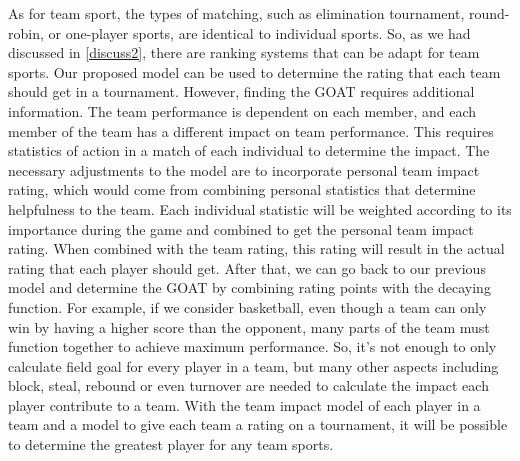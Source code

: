  As for team sport, the types of matching, such as elimination tournament,  round-robin, or one-player sports, are identical to individual sports. So, as we had discussed in \ref{discuss2}, there are ranking systems that can be adapt for team sports. Our proposed model can be used to determine the rating that each team should get in a tournament. However, finding the GOAT requires additional information. The team performance is dependent on each member, and each member of the team has a different impact on team performance. This requires statistics of action in a match of each individual to determine the impact. The necessary adjustments to the model are to incorporate personal team impact rating, which would come from combining personal statistics that determine helpfulness to the team. Each individual statistic will be weighted according to its importance during the game and combined to get the personal team impact rating. When combined with the team rating, this rating will result in the actual rating that each player should get. After that, we can go back to our previous model and determine the GOAT by combining rating points with the decaying function. For example, if we consider basketball, even though a team can only win by having a higher score than the opponent, many parts of the team must function together to achieve maximum performance. So, it's not enough to only calculate field goal for every player in a team, but many other aspects including block, steal, rebound or even turnover are needed to calculate the impact each player contribute to a team. With the team impact model of each player in a team and a model to give each team a rating on a tournament, it will be possible to determine the greatest player for any team sports. %